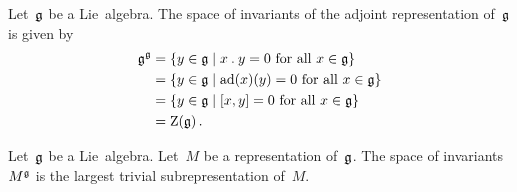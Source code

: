 

\begin{example}
  Let~$\mathfrak{g}$ be a Lie~algebra.
  The space of invariants of the adjoint representation of~$\mathfrak{g}$ is given by
  \begin{align*}
    \glie^{\glie}
    &=
    \{
      y \in \glie
    \suchthat
      \text{$x \act y = 0$ for all~$x \in \glie$}
    \}
    \\
    &=
    \{
      y \in \glie
    \suchthat
      \text{$\ad(x)(y) = 0$ for all~$x \in \glie$}
    \}
    \\
    &=
    \{
      y \in \glie
    \suchthat
      \text{$[x,y] = 0$ for all~$x \in \glie$}
    \}
    \\
    &=
    \centerlie(\glie) \,.
  \end{align*}
\end{example}


\begin{proposition}
  Let~$\mathfrak{g}$ be a Lie~algebra.
  Let~$M$ be a representation of~$\mathfrak{g}$.
  The space of invariants~$M^{\mathfrak{g}}$ is the largest trivial subrepresentation of~$M$.
\end{proposition}


